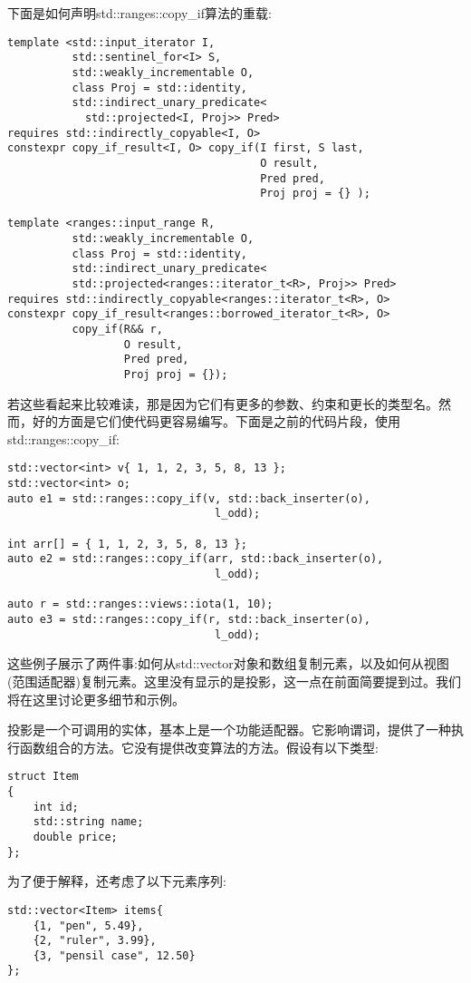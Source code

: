 下面是如何声明std::ranges::copy\_if算法的重载:

\begin{lstlisting}[style=styleCXX]
template <std::input_iterator I,
		  std::sentinel_for<I> S,
		  std::weakly_incrementable O,
		  class Proj = std::identity,
		  std::indirect_unary_predicate<
		    std::projected<I, Proj>> Pred>
requires std::indirectly_copyable<I, O>
constexpr copy_if_result<I, O> copy_if(I first, S last,
									   O result,
								   	   Pred pred,
									   Proj proj = {} );
									   
template <ranges::input_range R,
		  std::weakly_incrementable O,
		  class Proj = std::identity,
		  std::indirect_unary_predicate<
		  std::projected<ranges::iterator_t<R>, Proj>> Pred>
requires std::indirectly_copyable<ranges::iterator_t<R>, O>
constexpr copy_if_result<ranges::borrowed_iterator_t<R>, O>
		  copy_if(R&& r,
				  O result,
				  Pred pred,
				  Proj proj = {});
\end{lstlisting}

若这些看起来比较难读，那是因为它们有更多的参数、约束和更长的类型名。然而，好的方面是它们使代码更容易编写。下面是之前的代码片段，使用std::ranges::copy\_if:

\begin{lstlisting}[style=styleCXX]
std::vector<int> v{ 1, 1, 2, 3, 5, 8, 13 };
std::vector<int> o;
auto e1 = std::ranges::copy_if(v, std::back_inserter(o),
								l_odd);
								
int arr[] = { 1, 1, 2, 3, 5, 8, 13 };
auto e2 = std::ranges::copy_if(arr, std::back_inserter(o),
								l_odd);

auto r = std::ranges::views::iota(1, 10);
auto e3 = std::ranges::copy_if(r, std::back_inserter(o),
								l_odd);
\end{lstlisting}

这些例子展示了两件事:如何从std::vector对象和数组复制元素，以及如何从视图(范围适配器)复制元素。这里没有显示的是投影，这一点在前面简要提到过。我们将在这里讨论更多细节和示例。

投影是一个可调用的实体，基本上是一个功能适配器。它影响谓词，提供了一种执行函数组合的方法。它没有提供改变算法的方法。假设有以下类型:

\begin{lstlisting}[style=styleCXX]
struct Item
{
	int id;
	std::string name;
	double price;
};
\end{lstlisting}

为了便于解释，还考虑了以下元素序列:

\begin{lstlisting}[style=styleCXX]
std::vector<Item> items{
	{1, "pen", 5.49},
	{2, "ruler", 3.99},
	{3, "pensil case", 12.50}
};
\end{lstlisting}

